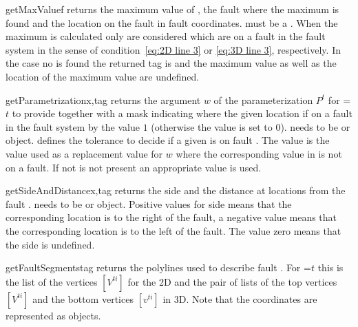 \begin{methoddesc}[FaultSystem]{getMaxValue}{f}
returns the maximum value of , the fault where the maximum is found and the location on the fault in fault coordinates.  must be a \Scalar. When the maximum is calculated only \DataSamplePoints are considered
which are on a fault in the fault system in the sense of condition~\ref{eq:2D line 3} or \ref{eq:3D line 3}, respectively. In the case no \DataSamplePoints is found the returned tag is  and
the maximum value as well as the location of the maximum value are undefined.
\end{methoddesc}

\begin{methoddesc}[FaultSystem]{getParametrization}{x,tag }
returns the argument $w$ of the parameterization $P^t$ for =$t$ to provide 
together with a mask indicating where the given location if on a fault in the fault system by the value $1$ (otherwise the value is set to $0$).  needs to be \Vector or \numpyNDA object.  defines the tolerance to decide if a given \DataSamplePoints is on fault . The value
 is the value used as a replacement value for $w$ where the corresponding value in  is not 
on a fault. If not  is not present an appropriate value is used.
\end{methoddesc}
 
\begin{methoddesc}[FaultSystem]{getSideAndDistance}{x,tag}
returns the side and the distance at locations  from the fault .
 needs to be \Vector or \numpyNDA object. Positive values for side means that the corresponding location is 
to the right of the fault, a negative value means that the corresponding location is 
to the left of the fault. The value zero means that the side is undefined.
\end{methoddesc}




\begin{methoddesc}[FaultSystem]{getFaultSegments}{tag}
returns the polylines used to describe fault . For =$t$ this is the list of the vertices
$[V^{ti}]$ for the 2D and the pair of lists of the top vertices $[V^{ti}]$ and the bottom vertices  $[v^{ti}]$ in 3D.
Note that the coordinates are represented as \numpyNDA objects.
\end{methoddesc}

